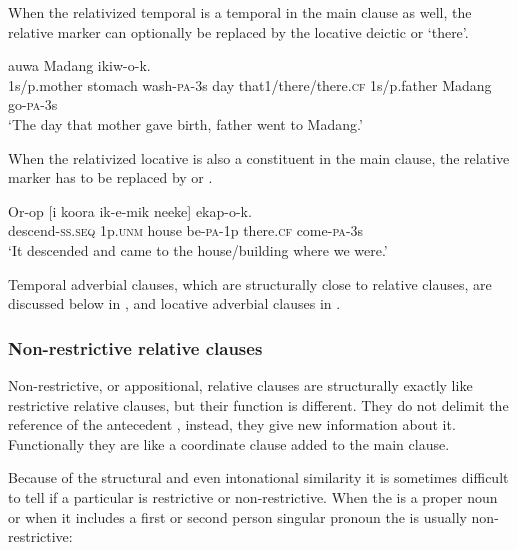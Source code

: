 When the relativized temporal  is a temporal in the main clause as well, the relative marker can optionally be replaced by the locative deictic  or  `there'.

\ea%
\label{ex:8:x1625}
 auwa  Madang  ikiw-o-k.\\
1s/p.mother  stomach  wash-\textsc{pa}-3s day that1/there/there.\textsc{cf} 1s/p.father Madang go-\textsc{pa}-3s\\
\glt`The day that mother gave birth, father went to Madang.'
\z


When the relativized locative  is also a constituent in the main clause, the relative marker has to be replaced by  or  .

\ea%
\label{ex:8:x1622}
\gll Or-op  [i  koora  ik-e-mik  neeke]  ekap-o-k.\\
descend-\textsc{ss}.\textsc{seq} 1p.\textsc{unm} house be-\textsc{pa}-1p there.\textsc{cf} come-\textsc{pa}-3s\\
\glt`It descended and came to the house/building where we were.'
\z


Temporal adverbial clauses, which are structurally close to relative clauses, are discussed below in , and locative adverbial clauses in .

\subsubsection{Non-restrictive relative clauses} \label{sec:8.3.1.4}

Non-restrictive, or appositional, relative clauses are structurally exactly like restrictive relative clauses, but their function is different. They do not delimit the reference of the antecedent , instead, they give new information about it. Functionally they are like a coordinate clause added to the main clause.

Because of the structural and even intonational similarity it is sometimes difficult to tell if a particular  is restrictive or non-restrictive. When the  is a proper noun or when it includes a first or second person singular pronoun the  is usually non-restrictive:

